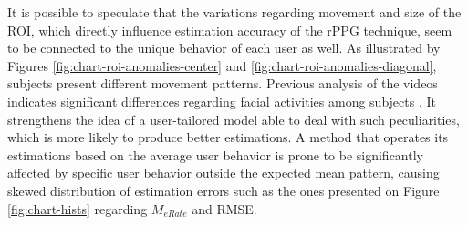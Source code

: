 It is possible to speculate that the variations regarding movement and size of the ROI, which directly influence estimation accuracy of the rPPG technique, seem to be connected to the unique behavior of each user as well. As illustrated by Figures \ref{fig:chart-roi-anomalies-center} and \ref{fig:chart-roi-anomalies-diagonal}, subjects present different movement patterns. Previous analysis of the videos indicates significant differences regarding facial activities among subjects \parencite{bevilacqua2016variations}. It strengthens the idea of a user-tailored model able to deal with such peculiarities, which is more likely to produce better estimations. A method that operates its estimations based on the average user behavior is prone to be significantly affected by specific user behavior outside the expected mean pattern, causing skewed distribution of estimation errors such as the ones presented on Figure \ref{fig:chart-hists} regarding $M_{eRate}$ and RMSE.




